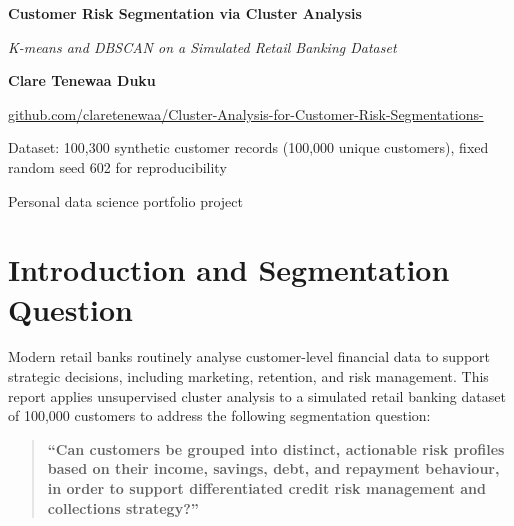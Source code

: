 \documentclass[11pt]{article}
\begin{document}
\begin{titlepage}
\centering
\vspace*{3.5cm}

{\huge\bfseries Customer Risk Segmentation via Cluster Analysis \par}
\vspace{0.5cm}
{\large\itshape\color{gray} K-means and DBSCAN on a Simulated Retail Banking Dataset \par}

\vspace{2.5cm}
{\Large\bfseries Clare Tenewaa Duku \par}
\vspace{0.3cm}
{\normalsize\color{gray} \href{https://github.com/claretenewaa/Cluster-Analysis-for-Customer-Risk-Segmentations-}{github.com/claretenewaa/Cluster-Analysis-for-Customer-Risk-Segmentations-} \par}

\vspace{2cm}
{\normalsize\color{gray} Dataset: 100,300 synthetic customer records (100,000 unique customers), fixed random seed 602 for reproducibility \par}

\vfill
{\small\color{gray} Personal data science portfolio project \par}
\end{titlepage}

\section{Introduction and Segmentation Question}

Modern retail banks routinely analyse customer-level financial data to support strategic decisions, including marketing, retention, and risk management. This report applies unsupervised cluster analysis to a simulated retail banking dataset of 100{,}000 customers to address the following segmentation question:

\begin{quote}
\bfseries ``Can customers be grouped into distinct, actionable risk profiles based on their income, savings, debt, and repayment behaviour, in order to support differentiated credit risk management and collections strategy?''
\end{quote}
\end{document}
